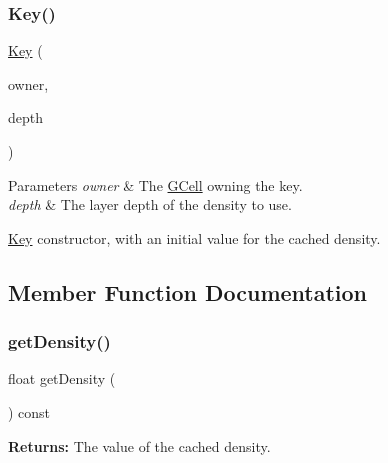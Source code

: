 \subsubsection{\texorpdfstring{Key()}{Key()}}
{\footnotesize\ttfamily \hyperlink{classKatabatic_1_1GCell_1_1Key}{Key} (\begin{DoxyParamCaption}\item[{\hyperlink{classKatabatic_1_1GCell}{G\+Cell} $\ast$}]{owner,  }\item[{unsigned int}]{depth }\end{DoxyParamCaption})\hspace{0.3cm}{\ttfamily [inline]}}


\begin{DoxyParams}{Parameters}
{\em owner} & The \hyperlink{classKatabatic_1_1GCell}{G\+Cell} owning the key. \\
\hline
{\em depth} & The layer {\ttfamily depth} of the density to use.\\
\hline
\end{DoxyParams}
\hyperlink{classKatabatic_1_1GCell_1_1Key}{Key} constructor, with an initial value for the cached density. 

\subsection{Member Function Documentation}
\mbox{\label{classKatabatic_1_1GCell_1_1Key_a9f45c741b4c738e833fe66fe125592b7}} 
\subsubsection{\texorpdfstring{get\+Density()}{getDensity()}}
{\footnotesize\ttfamily float get\+Density (\begin{DoxyParamCaption}{ }\end{DoxyParamCaption}) const\hspace{0.3cm}{\ttfamily [inline]}}

{\bfseries Returns\+:} The value of the cached density. \mbox{\label{classKatabatic_1_1GCell_1_1Key_a819cf639562a031a1e2e061fe1293d66}} 
